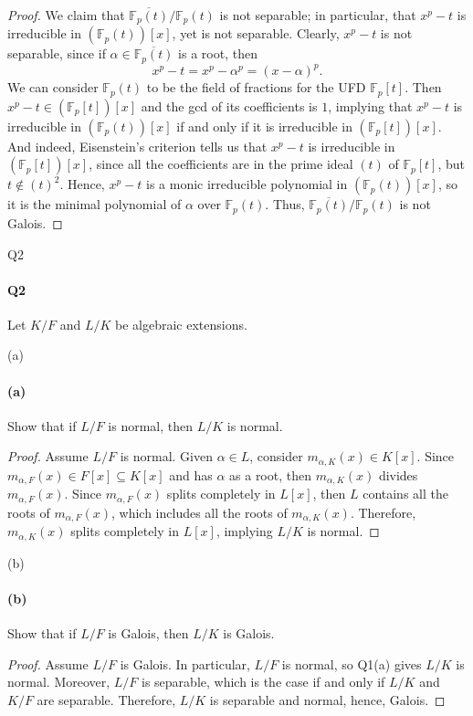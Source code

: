 \documentclass[12pt]{article}
\newenvironment{fullbox}{\begin{lrbox}{\savefullbox}\begin{minipage}{\dimexpr\textwidth-2\fboxsep\relax}}{\end{minipage}\end{lrbox}\begin{center}\framebox[\textwidth]{\usebox{\savefullbox}}\end{center}}
\newenvironment{pbox}[1][]{\begin{fullbox}\ifx#1\empty\else\paragraph{#1}\fi}{\end{fullbox}}
\newcommand{\<}{\langle}
\renewcommand{\>}{\rangle}
\newcommand{\clo}{\overline}
\newcommand{\F}{\mathbb{F}}
\begin{document}
\begin{proof}
    We claim that $\clo{\F_p(t)}/\F_p(t)$ is not separable; in particular, that $x^p - t$ is irreducible in $(\F_p(t))[x]$, yet is not separable. Clearly, $x^p - t$ is not separable, since if $\alpha \in \clo{\F_p(t)}$ is a root, then
    \[
        x^p - t = x^p - \alpha^p = (x - \alpha)^p.
    \]
    We can consider $\F_p(t)$ to be the field of fractions for the UFD $\F_p[t]$. Then $x^p - t \in (\F_p[t])[x]$ and the gcd of its coefficients is $1$, implying that $x^p - t$ is irreducible in $(\F_p(t))[x]$ if and only if it is irreducible in $(\F_p[t])[x]$. And indeed, Eisenstein's criterion tells us that $x^p - t$ is irreducible in $(\F_p[t])[x]$, since all the coefficients are in the prime ideal $(t)$ of $\F_p[t]$, but $t \notin (t)^2$. Hence, $x^p - t$ is a monic irreducible polynomial in $(\F_p(t))[x]$, so it is the minimal polynomial of $\alpha$ over $\F_p(t)$. Thus, $\clo{\F_p(t)}/\F_p(t)$ is not Galois.

\end{proof}

\newpage
\begin{pbox}[Q2]
    Let $K/F$ and $L/K$ be algebraic extensions.
\end{pbox}

\begin{pbox}[(a)]
    Show that if $L/F$ is normal, then $L/K$ is normal.
\end{pbox}

\begin{proof}
    Assume $L/F$ is normal. Given $\alpha \in L$, consider $m_{\alpha, K}(x) \in K[x]$. Since $m_{\alpha, F}(x) \in F[x] \subseteq K[x]$ and has $\alpha$ as a root, then $m_{\alpha, K}(x)$ divides $m_{\alpha, F}(x)$. Since $m_{\alpha, F}(x)$ splits completely in $L[x]$, then $L$ contains all the roots of $m_{\alpha, F}(x)$, which includes all the roots of $m_{\alpha, K}(x)$. Therefore, $m_{\alpha, K}(x)$ splits completely in $L[x]$, implying $L/K$ is normal.

\end{proof}

\begin{pbox}[(b)]
    Show that if $L/F$ is Galois, then $L/K$ is Galois.
\end{pbox}

\begin{proof}
    Assume $L/F$ is Galois. In particular, $L/F$ is normal, so Q1(a) gives $L/K$ is normal. Moreover, $L/F$ is separable, which is the case if and only if $L/K$ and $K/F$ are separable. Therefore, $L/K$ is separable and normal, hence, Galois.

\end{proof}
\end{document}
